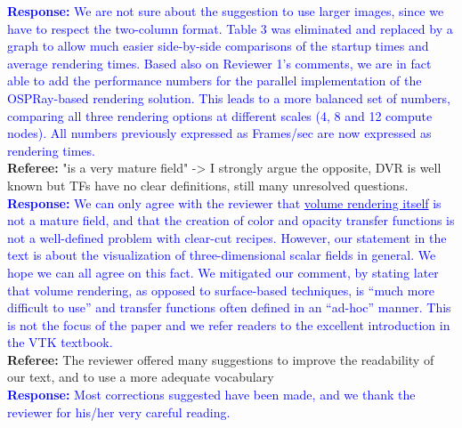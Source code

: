 \documentclass[]{article}
\begin{document}
\textcolor{blue}{\textbf{Response:} We are not sure about the suggestion to use larger images, since we have to respect the two-column format. Table 3 was eliminated and replaced by a graph to allow much easier side-by-side comparisons of the startup times and average rendering times. Based also on Reviewer 1's comments, we are in fact able to add the performance numbers for the parallel implementation of the OSPRay-based rendering solution. This leads to a more balanced set of numbers, comparing all three rendering options at different scales (4, 8 and 12 compute nodes). All numbers previously expressed as Frames/sec are now expressed as rendering times.} \\

\textbf{Referee:} "is a very mature field" -> I strongly argue the opposite, DVR is well known but TFs have no clear definitions, still many unresolved questions. \\

\textcolor{blue}{\textbf{Response:} We can only agree with the reviewer that \underline{volume rendering itself} is not a mature field, and that the creation of color and opacity transfer functions is not a well-defined problem with clear-cut recipes. However, our statement in the text is about the visualization of three-dimensional scalar fields in general. We hope we can all agree on this fact. We mitigated our  comment, by stating later that volume rendering, as opposed to surface-based techniques, is “much more difficult to use” and transfer functions often defined in an “ad-hoc” manner. This is not the focus of the paper and we refer readers  to the excellent introduction in the VTK textbook.} \\

\textbf{Referee:} The reviewer offered many suggestions to improve the readability of our text, and to use a more adequate vocabulary \\

\textcolor{blue}{\textbf{Response:} Most corrections suggested have been made, and we thank the reviewer for his/her very careful reading.} \\
\end{document}
